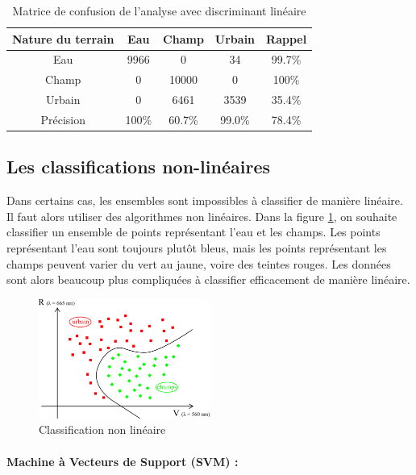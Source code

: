 \documentclass[a4paper,10pt]{article}
\begin{document}
\begin{table}[H]
\begin{center}
 \begin{tabular}{|c|c|c|c|c|}
  \hline
  Nature du terrain & Eau & Champ & Urbain & Rappel \\
  \hline
Eau & 9966  &   0  &      34 & 99.7\% \\
Champ & 0  &  10000   &     0 & 100\% \\
Urbain &  0    &    6461  &   3539   &     35.4\% \\
Précision & 100\% & 60.7\%  &      99.0\% & {\color{red}78.4\%}\\
  \hline
\end{tabular}
\end{center}
\caption{Matrice de confusion de l'analyse avec discriminant linéaire }
\label{table:veniseLDA}
\end{table}
    
     

\subsection{Les classifications non-linéaires}

Dans certains cas, les ensembles sont impossibles à classifier de manière linéaire. Il faut alors utiliser des algorithmes non linéaires. Dans la figure \ref{fig:ml_nlin}, on souhaite classifier un ensemble de points représentant l'eau et les champs. Les points représentant l'eau sont toujours plutôt bleus, mais les points représentant les champs peuvent varier du vert au jaune, voire des teintes rouges. Les données sont alors beaucoup plus compliquées à classifier efficacement de manière linéaire. 

\begin{figure}[H]
  \centering
    \includegraphics[width=0.5\textwidth]{ml_nlin}
  \caption{Classification non linéaire}
  \label{fig:ml_nlin}
\end{figure}

\paragraph{Machine à Vecteurs de Support (SVM) :}
\end{document}
